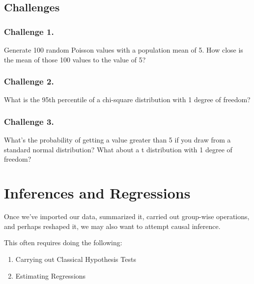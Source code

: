 \documentclass[]{book}
\providecommand{\tightlist}{%
  \setlength{\itemsep}{0pt}\setlength{\parskip}{0pt}}
\begin{document}
\hypertarget{challenges-13}{%
\subsection{Challenges}\label{challenges-13}}

\hypertarget{challenge-1.-9}{%
\subsubsection*{Challenge 1.}\label{challenge-1.-9}}

Generate 100 random Poisson values with a population mean of 5. How close is the mean of those 100 values to the value of 5?

\hypertarget{challenge-2.-9}{%
\subsubsection*{Challenge 2.}\label{challenge-2.-9}}

What is the 95th percentile of a chi-square distribution with 1 degree of freedom?

\hypertarget{challenge-3.-6}{%
\subsubsection*{Challenge 3.}\label{challenge-3.-6}}

What's the probability of getting a value greater than 5 if you draw from a standard normal distribution? What about a t distribution with 1 degree of freedom?

\hypertarget{inferences-and-regressions}{%
\section{Inferences and Regressions}\label{inferences-and-regressions}}

Once we've imported our data, summarized it, carried out group-wise operations, and perhaps reshaped it, we may also want to attempt causal inference.

This often requires doing the following:

\begin{enumerate}
\def\labelenumi{\arabic{enumi})}
\tightlist
\item
  Carrying out Classical Hypothesis Tests
\item
  Estimating Regressions
\end{enumerate}
\end{document}
